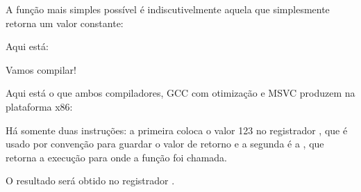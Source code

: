 
A função mais simples possível é indiscutivelmente aquela que simplesmente retorna um valor constante:

Aqui está:



Vamos compilar!


Aqui está o que ambos compiladores, GCC com otimização e MSVC produzem na plataforma x86:



Há somente duas instruções: a primeira coloca o valor 123 no registrador \EAX, que é usado por convenção para guardar o valor de retorno e a segunda é a \RET, que retorna a execução para onde a função foi chamada.

O resultado será obtido no registrador \EAX.


